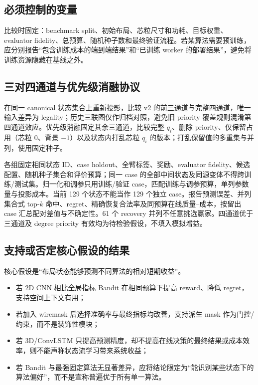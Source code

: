 \documentclass[UTF8,a4paper,11pt]{ctexart}
\begin{document}
\subsection{必须控制的变量}

比较时固定：benchmark split、初始布局、芯粒尺寸和功耗、目标权重、evaluator fidelity、总预算、随机种子数和最终验证流程。若某算法需要预训练，应分别报告“包含训练成本的端到端结果”和“已训练 worker 的部署结果”，避免将训练资源隐藏在基线之外。

\subsection{三对四通道与优先级消融协议}

在同一 canonical 状态集合上重新投影，比较 v2 的前三通道与完整四通道，唯一输入差异为 legality；历史三联图仅作归档对照，避免旧 priority 覆盖规则混淆第四通道效应。优先级消融固定其余三通道，比较完整 $q_i$、删除 priority、仅保留占用（芯粒 0、背景 $-1$）以及状态内打乱芯粒 $q_i$ 的版本；打乱保留值的多重集与并列，使用固定种子。

各组固定相同状态 ID、case holdout、全臂标签、奖励、evaluator fidelity、候选配置、随机种子集合和评价预算；同一 case 的全部中间状态及同源变体不得跨训练/测试集。归一化和调参只用训练/验证 case，匹配训练与调参预算，单列参数量与投影成本。当前 129 个状态不能当作 129 个独立 case。报告预测误差、并列集合式 top-$k$ 命中、regret、精确恢复合法率及同预算在线质量--成本，按留出 case 汇总配对差值与不确定性。61 个 recovery 并列不任意挑选赢家。四通道优于三通道及 degree priority 有效均为待检验假设，不填入模拟增益。

\subsection{支持或否定核心假设的结果}

核心假设是“布局状态能够预测不同算法的相对短期收益”。

\begin{itemize}
    \item 若 2D CNN 相比全局指标 Bandit 在相同预算下提高 reward、降低 regret，支持空间上下文有用；
    \item 若加入 wiremask 后选择准确率与最终指标均改善，支持派生 mask 作为门控/约束，而不是装饰性模块；
    \item 若 3D/ConvLSTM 只提高预测精度，却不提高在线决策的最终结果或成本效率，则不能声称状态流学习带来系统收益；
    \item 若 Bandit 与最强固定算法无显著差异，应将结论限定为“能识别某些状态下的算法偏好”，而不是宣称普遍优于所有单一算法。
\end{itemize}
\end{document}
